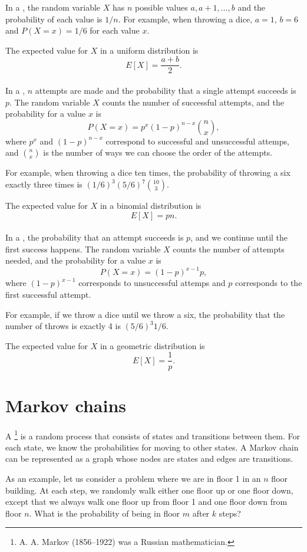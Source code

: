 In a ,
the random variable $X$ has $n$ possible
values $a,a+1,\ldots,b$ and the probability of each value is $1/n$.
For example, when throwing a dice,
$a=1$, $b=6$ and $P(X=x)=1/6$ for each value $x$.

The expected value for $X$ in a uniform distribution is
\[E[X] = \frac{a+b}{2}.\]
~\\
In a , $n$ attempts
are made
and the probability that a single attempt succeeds
is $p$.
The random variable $X$ counts the number of
successful attempts,
and the probability for a value $x$ is
\[P(X=x)=p^x (1-p)^{n-x} {n \choose x},\]
where $p^x$ and $(1-p)^{n-x}$ correspond to
successful and unsuccessful attemps,
and ${n \choose x}$ is the number of ways
we can choose the order of the attempts.

For example, when throwing a dice ten times,
the probability of throwing a six exactly
three times is $(1/6)^3 (5/6)^7 {10 \choose 3}$.

The expected value for $X$ in a binomial distribution is
\[E[X] = pn.\]
~\\
In a ,
the probability that an attempt succeeds is $p$,
and we continue until the first success happens.
The random variable $X$ counts the number
of attempts needed, and the probability for
a value $x$ is
\[P(X=x)=(1-p)^{x-1} p,\]
where $(1-p)^{x-1}$ corresponds to unsuccessful attemps
and $p$ corresponds to the first successful attempt.

For example, if we throw a dice until we throw a six,
the probability that the number of throws
is exactly 4 is $(5/6)^3 1/6$.

The expected value for $X$ in a geometric distribution is
\[E[X]=\frac{1}{p}.\]

\section{Markov chains}


A \footnote{A. A. Markov (1856--1922)
was a Russian mathematician.} is a random process
that consists of states and transitions between them.
For each state, we know the probabilities
for moving to other states.
A Markov chain can be represented as a graph
whose nodes are states and edges are transitions.

As an example, let us consider a problem
where we are in floor 1 in an $n$ floor building.
At each step, we randomly walk either one floor
up or one floor down, except that we always
walk one floor up from floor 1 and one floor down
from floor $n$.
What is the probability of being in floor $m$
after $k$ steps?

